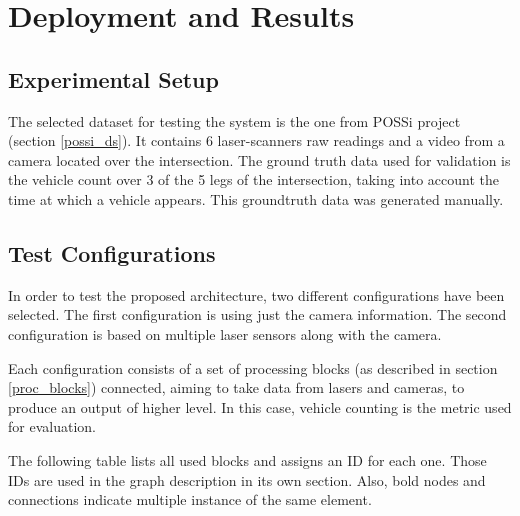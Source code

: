 \chapter [Deployment and Results]{Deployment and Results}

\section{Experimental Setup}

The selected dataset for testing the system is the one from POSSi project (section \ref{possi_ds}). It contains 6 laser-scanners raw readings and a video from a camera located over the intersection. The ground truth data used for validation is the vehicle count over 3 of the 5 legs of the intersection, taking into account the time at which a vehicle appears. This groundtruth data was generated manually.
 

\section{Test Configurations}
In order to test the proposed architecture, two different configurations have been selected. The first configuration is using just the camera information. The second configuration is based on multiple laser sensors along with the camera.

Each configuration consists of a set of processing blocks (as described in section \ref{proc_blocks}) connected, aiming to take data from  lasers and cameras, to produce an output of higher level. In this case, vehicle counting is the metric used for evaluation.

The following table lists all used blocks and assigns an ID for each one. Those IDs are used in the graph description in its own section. Also, bold nodes and connections indicate multiple instance of the same element.

